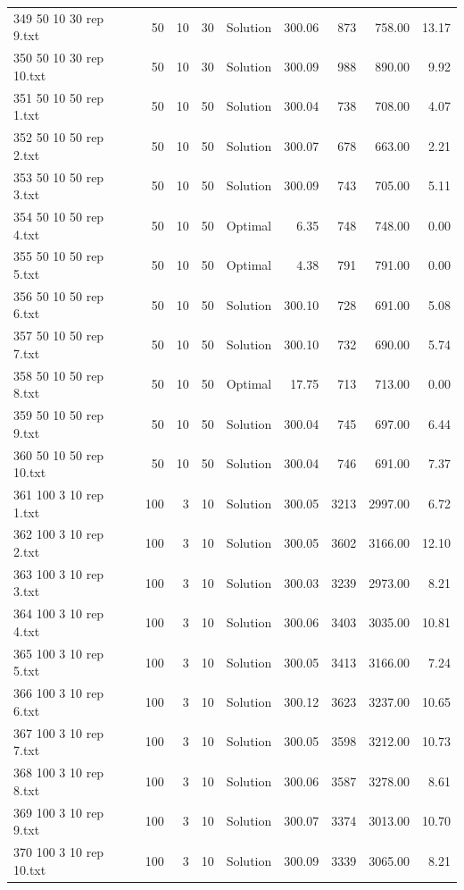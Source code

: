 \begin{longtable}{lrrllrrrr}
349 50 10 30 rep 9.txt & 50 & 10 & 30 & Solution & 300.06 & 873 & 758.00 & 13.17\\
350 50 10 30 rep 10.txt & 50 & 10 & 30 & Solution & 300.09 & 988 & 890.00 &  9.92\\
351 50 10 50 rep 1.txt & 50 & 10 & 50 & Solution & 300.04 & 738 & 708.00 &  4.07\\
352 50 10 50 rep 2.txt & 50 & 10 & 50 & Solution & 300.07 & 678 & 663.00 &  2.21\\
353 50 10 50 rep 3.txt & 50 & 10 & 50 & Solution & 300.09 & 743 & 705.00 &  5.11\\
354 50 10 50 rep 4.txt & 50 & 10 & 50 & Optimal &  6.35 & 748 & 748.00 &  0.00\\
355 50 10 50 rep 5.txt & 50 & 10 & 50 & Optimal &  4.38 & 791 & 791.00 &  0.00\\
356 50 10 50 rep 6.txt & 50 & 10 & 50 & Solution & 300.10 & 728 & 691.00 &  5.08\\
357 50 10 50 rep 7.txt & 50 & 10 & 50 & Solution & 300.10 & 732 & 690.00 &  5.74\\
358 50 10 50 rep 8.txt & 50 & 10 & 50 & Optimal & 17.75 & 713 & 713.00 &  0.00\\
359 50 10 50 rep 9.txt & 50 & 10 & 50 & Solution & 300.04 & 745 & 697.00 &  6.44\\
360 50 10 50 rep 10.txt & 50 & 10 & 50 & Solution & 300.04 & 746 & 691.00 &  7.37\\
361 100 3 10 rep 1.txt & 100 & 3 & 10 & Solution & 300.05 & 3213 & 2997.00 &  6.72\\
362 100 3 10 rep 2.txt & 100 & 3 & 10 & Solution & 300.05 & 3602 & 3166.00 & 12.10\\
363 100 3 10 rep 3.txt & 100 & 3 & 10 & Solution & 300.03 & 3239 & 2973.00 &  8.21\\
364 100 3 10 rep 4.txt & 100 & 3 & 10 & Solution & 300.06 & 3403 & 3035.00 & 10.81\\
365 100 3 10 rep 5.txt & 100 & 3 & 10 & Solution & 300.05 & 3413 & 3166.00 &  7.24\\
366 100 3 10 rep 6.txt & 100 & 3 & 10 & Solution & 300.12 & 3623 & 3237.00 & 10.65\\
367 100 3 10 rep 7.txt & 100 & 3 & 10 & Solution & 300.05 & 3598 & 3212.00 & 10.73\\
368 100 3 10 rep 8.txt & 100 & 3 & 10 & Solution & 300.06 & 3587 & 3278.00 &  8.61\\
369 100 3 10 rep 9.txt & 100 & 3 & 10 & Solution & 300.07 & 3374 & 3013.00 & 10.70\\
370 100 3 10 rep 10.txt & 100 & 3 & 10 & Solution & 300.09 & 3339 & 3065.00 &  8.21\\

\end{longtable}
